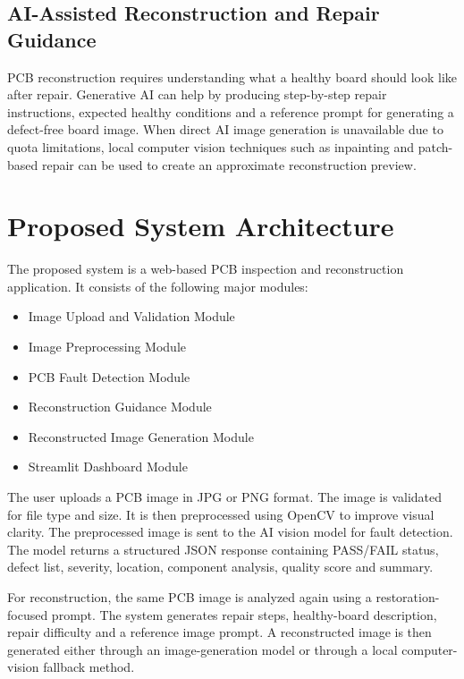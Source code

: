 \documentclass[12pt,a4paper]{report}
\begin{document}
\section{AI-Assisted Reconstruction and Repair Guidance}

PCB reconstruction requires understanding what a healthy board should look like after repair. Generative AI can help by producing step-by-step repair instructions, expected healthy conditions and a reference prompt for generating a defect-free board image. When direct AI image generation is unavailable due to quota limitations, local computer vision techniques such as inpainting and patch-based repair can be used to create an approximate reconstruction preview.

\chapter{Proposed System Architecture}

The proposed system is a web-based PCB inspection and reconstruction application. It consists of the following major modules:

\begin{itemize}
    \item Image Upload and Validation Module
    \item Image Preprocessing Module
    \item PCB Fault Detection Module
    \item Reconstruction Guidance Module
    \item Reconstructed Image Generation Module
    \item Streamlit Dashboard Module
\end{itemize}

The user uploads a PCB image in JPG or PNG format. The image is validated for file type and size. It is then preprocessed using OpenCV to improve visual clarity. The preprocessed image is sent to the AI vision model for fault detection. The model returns a structured JSON response containing PASS/FAIL status, defect list, severity, location, component analysis, quality score and summary.

For reconstruction, the same PCB image is analyzed again using a restoration-focused prompt. The system generates repair steps, healthy-board description, repair difficulty and a reference image prompt. A reconstructed image is then generated either through an image-generation model or through a local computer-vision fallback method.
\end{document}

